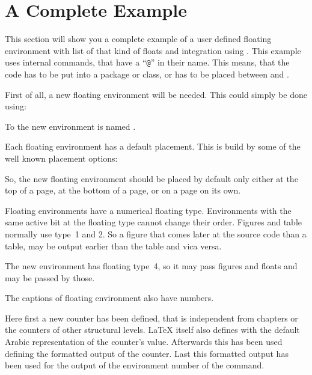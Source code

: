 \section{A Complete Example}

This section will show you a complete example of a user defined floating
environment with list of that kind of floats and \KOMAScript{} integration
using . This example uses internal commands, that have a
``\texttt{@}'' in their name. This means, that the code
has to be put into a package or class, or has to be placed between
%
 and .

First of all, a new floating environment will be
needed. This could simply be done using:
\begin{lstcode}
  \newenvironment{remarkbox}{%
    \@float{remarkbox}%
  }{%
    \end@float
  }
\end{lstcode}
To the new environment is named .

Each floating environment has a default
placement. This is build by some of the well known placement options:
\begin{lstcode}
  \newcommand*{\fps@remarkbox}{tbp}
\end{lstcode}
So, the new floating environment should be placed by default only either at
the top of a page, at the bottom of a page, or on a page on its own.

Floating environments have a numerical floating
type. Environments with the same active bit at the floating type cannot change
their order. Figures and table normally use type~1 and 2. So a figure that
comes later at the source code than a table, may be output earlier than the
table and vica versa.
\begin{lstcode}
  \newcommand*{\ftype@remarkbox}{4}
\end{lstcode}
The new environment has floating type~4, so it may pass figures and floats and
may be passed by those.

The captions of floating environment also have numbers.
\begin{lstcode}
  \newcommand*{\remarkboxformat}{%
    Remark~\theremarkbox\csname autodot\endcsname}
  \newcommand*{\fnum@remarkbox}{\remarkboxformat}
\end{lstcode}
Here first a new counter has been defined, that is independent from chapters
or the counters of other structural levels. \LaTeX{} itself also defines
 with the default Arabic representation of the counter's
value. Afterwards this has been used defining the formatted output of the
counter. Last this formatted output has been used for the output of the
environment number of the  command.

